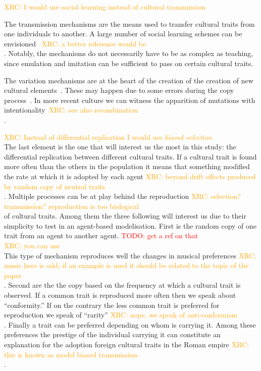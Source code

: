 \documentclass{wscpaperproc}
\newcommand{\memo}[2]{\textcolor{#1}{#2}}
\newcommand{\todo}[1]{\memo{red}{TODO: #1\\}}
\newcommand{\xrc}[1]{\memo{orange}{XRC: #1\\}}
\begin{document}
\xrc{I would use social learning instead of cultural transmission}

The transmission mechanisms are the means used to transfer cultural traits from one individuals to another. A large number of social learning schemes can be envisioned~\cite{heyes_social_1994} \xrc{a better reference would be \cite{henrich_evolution_2003}}. Notably, the mechanisms do not necessarily have to be as complex as teaching, since emulation and imitation can be sufficient to pass on certain cultural traits.

The variation mechanisms are at the heart of the creation of the creation of new cultural elements~\cite{obrien_variation_1990}. These may happen due to some errors during the copy process~\cite{schillinger_copying_2014}. In more recent culture we can witness the apparition of mutations with intentionality~\cite{ziman_technological_2003}\xrc{see also recombination \cite{sole_evolutionary_2013}}.

\xrc{Instead of differential replication I would use \emph{biased selection}}
The last element is the one that will interest us the most in this study: the differential replication between different cultural traits. If a cultural trait is found more often than the others in the population it means that something modified the rate at which it is adopted by each agent \xrc{beyond drift effects produced by random copy of neutral traits \cite{bentley_random_2004}}.
Multiple processes can be at play behind the reproduction \xrc{selection? transmission? reproduction is too biological} of cultural traits. Among them the three following will interest us due to their simplicity to test in an agent-based modelisation. First is the random copy of one trait from an agent to another agent. 
\todo{get a ref on that} \xrc{you can use \cite{bentley_random_2004}}
This type of mechanism reproduces well the changes in musical preferences \xrc{music here is odd; if an example is used it should be related to the topic of the paper}. Second are the the copy based on the frequency at which a cultural trait is observed. If a common trait is reproduced more often then we speak about ``conformity.'' If on the contrary the less common trait is preferred for reproduction we speak of ``rarity'' \xrc{nope, we speak of anti-conformism}. Finally a trait can be preferred depending on whom is carrying it. Among these preferences the prestige of the individual carrying it can constitute an explanation for the adoption foreign cultural traits in the Roman empire \xrc{this is known as model biased transmission}.
\end{document}
